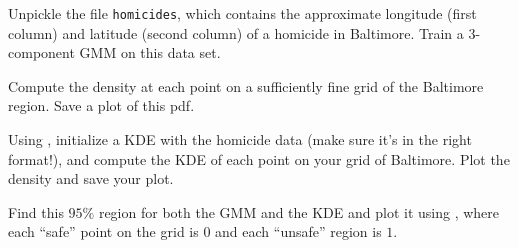 
Unpickle the file \texttt{homicides}, which contains the approximate longitude (first column) and latitude (second column) of a homicide in Baltimore. Train a $3$-component GMM on this data set.

Compute the density at each point on a sufficiently fine grid of the Baltimore region. Save a plot of this pdf.

Using , initialize a KDE with the homicide data (make sure it's in the right format!), and compute the KDE of each point on your grid of Baltimore. Plot the density and save your plot.

Find this $95\%$ region for both the GMM and the KDE and plot it using , where each ``safe'' point on the grid is $0$ and each ``unsafe'' region is $1$.

